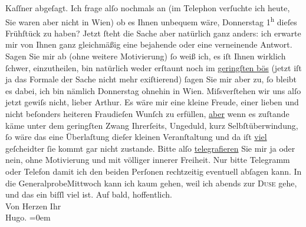 \begin{ledgroupsized}[t]{13cm}
                  Kaſſner abgeſagt.\pend
           \pstart
           Ich frage alſo nochmals an (im Telephon verſuchte ich heute, Sie waren aber nicht in
                  Wien) ob es Ihnen unbequem wäre,
                  Donnerstag{ }1\textsuperscript{h} dieſes Frühſtück zu haben? Jetzt ſteht die Sache aber
                  {\pb}natürlich ganz anders: ich
               erwarte mir von Ihnen ganz gleichmäßig eine bejahende oder eine verneinende Antwort.
               Sagen Sie mir ab (ohne weitere Motivierung) ſo weiß ich, es iſt Ihnen wirklich
               ſchwer, einzutheilen, bin natürlich weder erſtaunt noch im \uline{geringſten bös} (jetzt iſt ja das Formale der Sache nicht mehr exiſtierend)
                  {\pb}ſagen Sie mir aber zu, ſo
               bleibt es dabei, ich bin nämlich Donnerstag ohnehin in Wien.\pend
           \pstart
           Miſsverſtehen wir uns alſo jetzt gewiſs nicht, lieber Arthur.\pend
           \pstart
           Es wäre mir eine kleine Freude, einer lieben und nicht beſonders heiteren Fraudieſen Wunſch zu erfüllen, \uline{aber} wenn es zuſtande käme unter dem geringſten Zwang
               Ihrerſeits, Ungeduld, kurz Selbſtüberwindung, ſo wäre das eine Überlaſtung dieſer
               kleinen Veranſtaltung und da iſt \uline{viel} geſcheidter {\pb}ſie kommt gar nicht zustande.\pend
           \pstart
           Bitte alſo \uline{telegrafieren} Sie mir ja oder nein, ohne
               Motivierung und mit völliger innerer Freiheit.\pend
           \pstart
           Nur bitte Telegramm oder Telefon damit ich den beiden Perſonen rechtzeitig eventuell {\pb}abſagen kann.\pend
           \pstart
           In die GeneralprobeMittwoch kann ich kaum gehen, weil ich abends zur \textsc{Duse} gehe, und das ein biſſl viel ist.\pend
           \pstart
           Auf bald, hoffentlich.{\\[\baselineskip]}Von Herzen Ihr{\\[\baselineskip]}\spacefill\mbox{Hugo.}\pend
           \leftskip=0em{}
         
         \endnumbering{}\end{ledgroupsized}  \newcommand{\dateiname}{L01213}\newcommand{\titel}{Hugo von Hofmannsthal an Arthur Schnitzler, [30. 3. 1902]}\newcommand{\editorInnen}{Martin Anton Müller und Gerd-Hermann Susen}
      